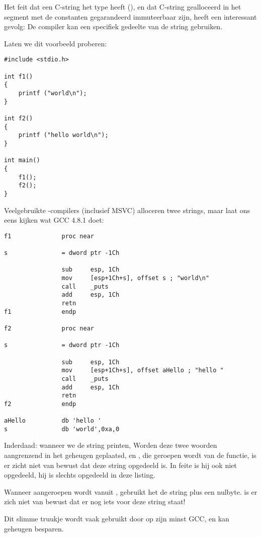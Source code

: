 \label{use_parts_of_C_strings}

Het feit dat een  C-string het type  heeft (), 
en dat C-string gealloceerd in het segment met de constanten gegarandeerd immuteerbaar zijn, heeft een interessant gevolg:
De compiler kan een specifiek gedeelte van de string gebruiken.

Laten we dit voorbeeld proberen:

\begin{lstlisting}
#include <stdio.h>

int f1()
{
	printf ("world\n");
}

int f2()
{
	printf ("hello world\n");
}

int main()
{
	f1();
	f2();
}
\end{lstlisting}

Veelgebruikte \CCpp{}-compilers (inclusief MSVC) alloceren twee strings, maar laat ons eens kijken wat GCC 4.8.1 doet:

\begin{lstlisting}[caption=GCC 4.8.1 + \RU{листинг в }IDA\EN{ listing}]
f1              proc near

s               = dword ptr -1Ch

                sub     esp, 1Ch
                mov     [esp+1Ch+s], offset s ; "world\n"
                call    _puts
                add     esp, 1Ch
                retn
f1              endp

f2              proc near

s               = dword ptr -1Ch

                sub     esp, 1Ch
                mov     [esp+1Ch+s], offset aHello ; "hello "
                call    _puts
                add     esp, 1Ch
                retn
f2              endp

aHello          db 'hello '
s               db 'world',0xa,0
\end{lstlisting}

Inderdaad: wanneer we de  string printen, 
Worden deze twee woorden aangrenzend in het geheugen geplaatsd, en \puts, die geroepen wordt van de 
functie, is er zicht niet van bewust dat deze string opgedeeld is. 
In feite is hij ook niet opgedeeld, hij is slechts  opgedeeld in deze listing.

Wanneer \puts aangeroepen wordt vanuit , gebruikt het de  string plus een nulbyte. \puts is er zich niet van bewust dat er nog iets voor deze string staat!

Dit slimme truukje wordt vaak gebruikt door op zijn minst GCC, en kan geheugen besparen.

